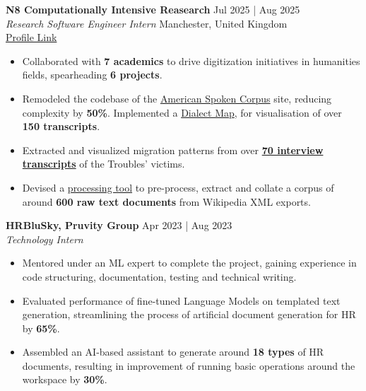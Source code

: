 \documentclass[a4paper,1.5pt]{extarticle}
\begin{document}
\textbf{N8 Computationally Intensive Reasearch} \hfill Jul 2025 | Aug 2025 \\ 
\textit{Research Software Engineer Intern} \hfill Manchester, United Kingdom \\ %
\href{https://n8cir.org.uk/themes/internships/internships-2025/manchester/}{Profile Link}
\begin{itemize}
    \item Collaborated with \textbf{7 academics} to drive digitization initiatives in humanities fields, spearheading \textbf{6 projects}.
    \item Remodeled the codebase of the \href{www.spokencorpus.org}{American Spoken Corpus} site, reducing complexity by \textbf{50\%}. Implemented a \href{https://spokencorpus.org/map_search.php}{Dialect Map}, for visualisation of over \textbf{150 transcripts}.
    \item Extracted and visualized migration patterns from over \href{https://conflictmemorymigration.manchester.ac.uk/interviews/}{\textbf{70 interview transcripts}} of the Troubles' victims. 
    \item Devised a \href{https://github.com/manojmanikandan7/WikipediaXmlParser}{processing tool} to pre-process, extract and collate a corpus of around \textbf{600 raw text documents} from Wikipedia XML exports. 
\end{itemize}
\textbf{HRBluSky, Pruvity Group} \hfill Apr 2023 | Aug 2023 \\ %
\textit{Technology Intern}  %
\begin{itemize}
    \item Mentored under an ML expert to complete the project, gaining experience in code structuring, documentation, testing and technical writing.
    \item Evaluated performance of fine-tuned Language Models on templated text generation, streamlining the process of artificial document generation for HR by \textbf{65\%}.
    \item Assembled an AI-based assistant to generate around \textbf{18 types} of HR documents, resulting in improvement of running basic operations around the workspace by \textbf{30\%}.
\end{itemize}


\end{document}
